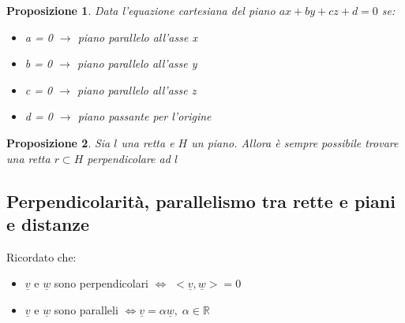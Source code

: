 \documentclass[12pt]{article}
\newenvironment{para}{\begin{adjustwidth}{13mm}{}}{\end{adjustwidth}}
\newtheorem{Proposizione}{Proposizione}[subsection]
\begin{document}
\begin{para}
\begin{Proposizione}
    Data l'equazione cartesiana del piano $ax+by+cz+d=0$ se: \begin{itemize}
        \item a = 0 $\rightarrow $ piano parallelo all'asse x
        \item b = 0 $\rightarrow $ piano parallelo all'asse y
        \item c = 0 $\rightarrow $ piano parallelo all'asse z
        \item d = 0 $\rightarrow $ piano passante per l'origine
    \end{itemize}
\end{Proposizione}
\begin{Proposizione}
    Sia $l$ una retta e $H$ un piano. Allora è sempre possibile trovare una retta $r \subset H$ perpendicolare ad $l$
\end{Proposizione}
\subsection{Perpendicolarità, parallelismo tra rette e piani e distanze}
Ricordato che:
\begin{itemize}
    \item $\underline{v}$ e $\underline{w}$ sono perpendicolari $\Leftrightarrow$ $<\underline{v}, \underline{w}> = 0$
    \item $\underline{v}$ e $\underline{w}$ sono paralleli $\Leftrightarrow \underline{v} = \alpha\underline{w}, \; \alpha\in \mathbb{R}$
\end{itemize}

\end{para}
\end{document}
